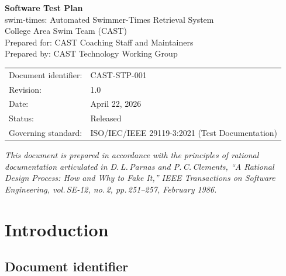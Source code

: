 \documentclass[12pt]{article}
\begin{document}
\begin{titlepage}
  \centering
  \vspace*{2cm}
  {\Huge\bfseries\color{castblue} Software Test Plan\\[0.5em]}
  {\Large swim-times: Automated Swimmer-Times Retrieval System}\\[2em]
  {\large College Area Swim Team (CAST)}\\[0.5em]
  {\normalsize Prepared for: CAST Coaching Staff and Maintainers}\\[0.5em]
  {\normalsize Prepared by: CAST Technology Working Group}\\[2em]
  \begin{tabular}{ll}
    Document identifier: & CAST-STP-001                                       \\
    Revision:            & 1.0                                                \\
    Date:                & April 22, 2026                                     \\
    Status:              & Released                                           \\
    Governing standard:  & ISO/IEC/IEEE 29119-3:2021 (Test Documentation)     \\
  \end{tabular}
  \vfill
  {\small\textit{This document is prepared in accordance with the principles
  of rational documentation articulated in D.\,L.\,Parnas and P.\,C.\,Clements,
  ``A Rational Design Process: How and Why to Fake It,''
  \textit{IEEE Transactions on Software Engineering}, vol.\,SE-12, no.\,2,
  pp.\,251--257, February 1986.}}
\end{titlepage}

\tableofcontents
\clearpage

\section{Introduction}

\subsection{Document identifier}
\end{document}
